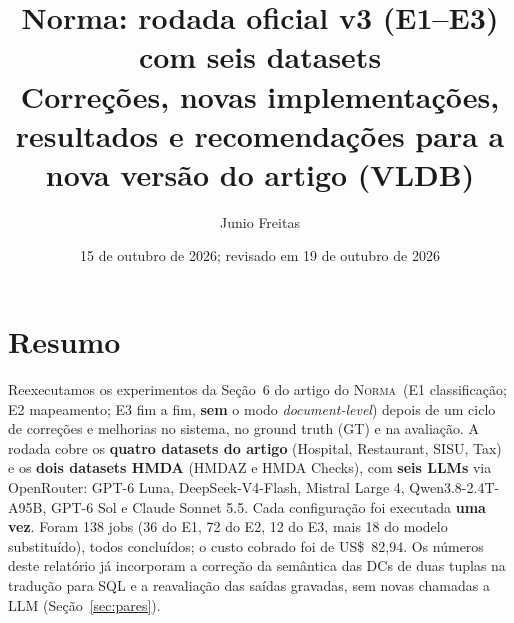 \documentclass[11pt,a4paper]{article}
\title{\textbf{Norma: rodada oficial v3 (E1--E3) com seis datasets}\\[2pt]
\large Correções, novas implementações, resultados e recomendações para a nova versão do artigo (VLDB)}
\author{Junio Freitas}
\date{15 de outubro de 2026; revisado em 19 de outubro de 2026}
\newcommand{\system}{\textsc{Norma}}
\begin{document}
\maketitle
\thispagestyle{fancy}

\section*{Resumo}

Reexecutamos os experimentos da Seção~6 do artigo do \system\ (E1 classificação; E2 mapeamento; E3 fim a fim,
\textbf{sem} o modo \emph{document-level}) depois de um ciclo de correções e melhorias no sistema, no ground truth
(GT) e na avaliação. A rodada cobre os \textbf{quatro datasets do artigo} (Hospital, Restaurant, SISU, Tax) e os
\textbf{dois datasets HMDA} (HMDAZ e HMDA Checks), com \textbf{seis LLMs} via OpenRouter: GPT-6 Luna,
DeepSeek-V4-Flash, Mistral Large 4, Qwen3.8-2.4T-A95B, GPT-6 Sol e Claude Sonnet 5.5. Cada configuração foi
executada \textbf{uma vez}. Foram 138 jobs (36 do E1, 72 do E2, 12 do E3, mais 18 do modelo substituído), todos
concluídos; o custo cobrado foi de US\$~82,94. Os números deste relatório já incorporam a correção da
semântica das DCs de duas tuplas na tradução para SQL e a reavaliação das saídas gravadas, sem novas chamadas a
LLM (Seção~\ref{sec:pares}).
\end{document}
